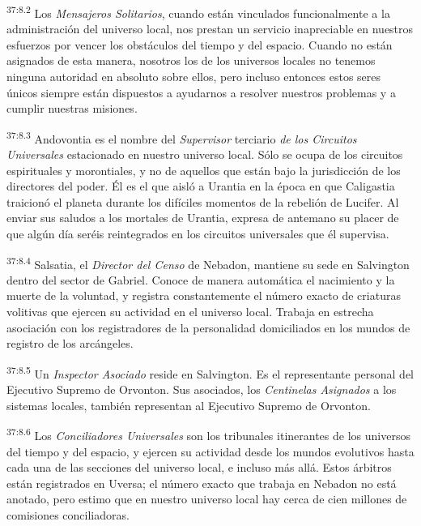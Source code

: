 \par
\textsuperscript{37:8.2} Los \textit{Mensajeros Solitarios}, cuando están vinculados funcionalmente a la administración del universo local, nos prestan un servicio inapreciable en nuestros esfuerzos por vencer los obstáculos del tiempo y del espacio. Cuando no están asignados de esta manera, nosotros los de los universos locales no tenemos ninguna autoridad en absoluto sobre ellos, pero incluso entonces estos seres únicos siempre están dispuestos a ayudarnos a resolver nuestros problemas y a cumplir nuestras misiones.

\par
\textsuperscript{37:8.3} Andovontia es el nombre del \textit{Supervisor} terciario \textit{de los Circuitos Universales} estacionado en nuestro universo local. Sólo se ocupa de los circuitos espirituales y morontiales, y no de aquellos que están bajo la jurisdicción de los directores del poder. Él es el que aisló a Urantia en la época en que Caligastia traicionó el planeta durante los difíciles momentos de la rebelión de Lucifer. Al enviar sus saludos a los mortales de Urantia, expresa de antemano su placer de que algún día seréis reintegrados en los circuitos universales que él supervisa.

\par
\textsuperscript{37:8.4} Salsatia, el \textit{Director del Censo} de Nebadon, mantiene su sede en Salvington dentro del sector de Gabriel. Conoce de manera automática el nacimiento y la muerte de la voluntad, y registra constantemente el número exacto de criaturas volitivas que ejercen su actividad en el universo local. Trabaja en estrecha asociación con los registradores de la personalidad domiciliados en los mundos de registro de los arcángeles.

\par
\textsuperscript{37:8.5} Un \textit{Inspector Asociado} reside en Salvington. Es el representante personal del Ejecutivo Supremo de Orvonton. Sus asociados, los \textit{Centinelas Asignados} a los sistemas locales, también representan al Ejecutivo Supremo de Orvonton.

\par
\textsuperscript{37:8.6} Los \textit{Conciliadores Universales} son los tribunales itinerantes de los universos del tiempo y del espacio, y ejercen su actividad desde los mundos evolutivos hasta cada una de las secciones del universo local, e incluso más allá. Estos árbitros están registrados en Uversa; el número exacto que trabaja en Nebadon no está anotado, pero estimo que en nuestro universo local hay cerca de cien millones de comisiones conciliadoras.

